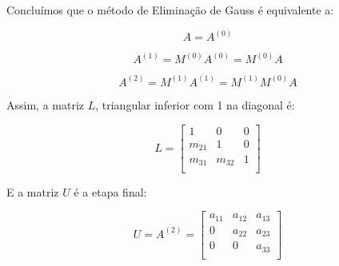 \documentclass[a4paper]{article}
\begin{document}
Concluímos que o método de Eliminação de Gauss é equivalente a:

\begin{displaymath}
  A = A^{(0)}
\end{displaymath}

\begin{displaymath}
  A^{(1)} = M^{(0)}A^{(0)} = M^{(0)}A
\end{displaymath}

\begin{displaymath}
  A^{(2)} = M^{(1)}A^{(1)} = M^{(1)}M^{(0)}A
\end{displaymath}

Assim, a matriz $L$, triangular inferior com 1 na diagonal é:

\begin{displaymath}
  L = \begin{bmatrix}
    1 & 0 & 0 \\
    m_{21} & 1 & 0 \\
    m_{31} & m_{32} & 1 \\
  \end{bmatrix}
\end{displaymath}

E a matriz $U$ é a etapa final:

\begin{displaymath}
  U = A^{(2)} = \begin{bmatrix}
    a_{11} & a_{12} & a_{13} \\
    0 & a_{22} & a_{23} \\
    0 & 0 & a_{33} \\
  \end{bmatrix}
\end{displaymath}
\end{document}
